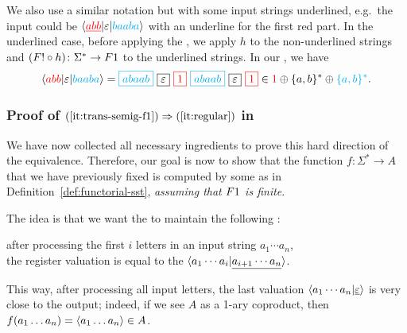 We also use a similar notation but with some input strings underlined, e.g.~the input could be $\langle {\color{red}\underline{abb}} | \varepsilon | {\color{cyan}baaba} \rangle$ with an underline for the first red part. In the underlined case, before applying the , we apply $h$ to the non-underlined strings and
$(\functor! \circ h) \colon \Sigma^* \to \functor1$
to the underlined strings. In our , we have
\begin{align*}
  \tuple{\red{abb} | \varepsilon | \blue{baaba}} =  
  \blue{\boxed{abaab}} \ 
  \boxed{\varepsilon} \ 
  \red{\boxed{1}} \ 
  \blue{\boxed{abaab}} \
  \boxed{\varepsilon} \
  \red{\boxed{1}}
  \in \red{1} \oplus \set{a,b}^*  \oplus \blue{\set{a,b}^*}.
\end{align*}

\subsubsection{Proof of $(\ref{it:trans-semig-f1}) \Rightarrow (\ref{it:regular})$ in }
We have now collected all necessary ingredients to prove this hard direction of
the equivalence. Therefore, our goal is now to show that the function $f\colon
\Sigma^* \to A$ that we have previously fixed is computed by some  as in Definition~\ref{def:functorial-sst},
\emph{assuming that $\functor 1$ is finite}.

The idea is that we want the \functorialsst to maintain the following : 
\begin{center}
  after processing the first $i$ letters in an input string $a_1 \cdots a_n$,\\ the register valuation is equal to the \kl{factorized output} $\langle a_1 \cdots a_i | \underline{a_{i+1} \cdots a_n} \rangle$.  
\end{center}
 This way, after processing all input letters, the last valuation $\langle a_1 \cdots a_n | \underline{\varepsilon} \rangle$ is very close to the output; indeed, if we see $A$ as a 1-ary coproduct, then $f(a_1\dots a_n) = \langle a_1 \dots a_n \rangle \in A$.

